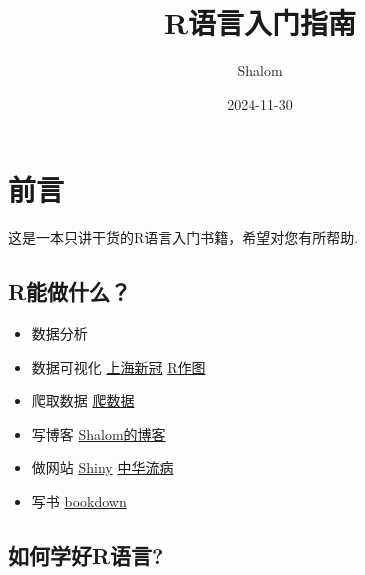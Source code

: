 \documentclass[
  letterpaper,
  DIV=11,
  numbers=noendperiod]{scrreprt}
\title{R语言入门指南}
\author{Shalom}
\date{2024-11-30}
\renewcommand*\contentsname{目录}
\newcommand\contentsname{目录}
\begin{document}
\maketitle

\renewcommand*\contentsname{目录}
{
\hypersetup{linkcolor=}
\setcounter{tocdepth}{2}
\tableofcontents
}


\chapter*{前言}\label{ux524dux8a00}


这是一本只讲干货的R语言入门书籍，希望对您有所帮助.

\section*{R能做什么？}\label{rux80fdux505aux4ec0ux4e48}


\begin{itemize}
\item
  数据分析
\item
  数据可视化 \href{https://rrr.is/covid}{上海新冠}
  \href{https://chart.rlearner.com}{R作图}
\item
  爬取数据 \href{https://blog.rlearner.com/r/rvest-base.html}{爬数据}
\item
  写博客 \href{https://blog.rlearner.com}{Shalom的博客}
\item
  做网站 \href{https://shiny.posit.co/r/gallery/}{Shiny}
  \href{https://learn-r.shinyapps.io/epi-china/}{中华流病}
\item
  写书 \href{https://bookdown.org/}{bookdown}
\end{itemize}

\section*{如何学好R语言?}\label{ux5982ux4f55ux5b66ux597drux8bedux8a00}

\end{document}
